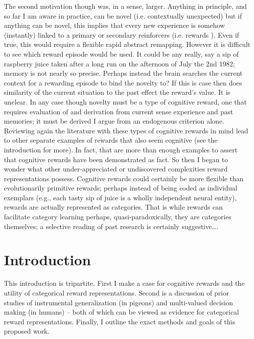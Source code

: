 \documentclass[doc,12pt]{apa}        %
\begin{document}
The second motivation though was, in a sense, larger.  Anything in principle, and so far I am aware in practice, can be novel (i.e. contextually unexpected) but if anything can be novel, this implies that every new experience is somehow (instantly) linked to a primary or secondary reinforcers (i.e. rewards ).  Even if true, this would require a flexible rapid abstract remapping.  However it is difficult to see which reward episode would be used.  It could be any really, say a sip of raspberry juice taken after a long run on the afternoon of July the 2nd 1982; memory is not nearly so precise.  Perhaps instead the brain searches the current context for a rewarding episode to bind the novelty to?  If this is case then does similarity of the current situation to the past effect the reward's value. It is unclear.  In any case though novelty must be a type of cognitive reward, one that requires evaluation of and derivation from current sense experience and past memories; it must be derived I argue from an endogenous criterion alone.  Reviewing again the literature with these types of cognitive rewards in mind lead to other separate examples of rewards that also seem cognitive (see the introduction for more).  In fact, that are more than enough examples to assert that cognitive rewards have been demonstrated as fact.  So then I began to wonder what other under-appreciated or undiscovered complexities reward representations possess.  Cognitive rewards could certainly be more flexible than evolutionarily primitive rewards; perhaps instead of being coded as individual exemplars (e.g., each tasty sip of juice is a wholly independent neural entity), rewards are actually represented as categories.  That is while rewards can facilitate category learning perhaps, quasi-paradoxically, they are categories themselves; a selective reading of past research is certainly suggestive\ldots.

\section{Introduction} %
\label{sec:introduction}
This introduction is tripartite.  First I make a case for cognitive rewards and the utility of categorical reward representations.  Second is a discussion of prior studies of instrumental generalization (in pigeons) and multi-valued decision making (in humans) -- both of which can be viewed as evidence for categorical reward representations.  Finally, I outline the exact methods and goals of this proposed work.
\end{document}
